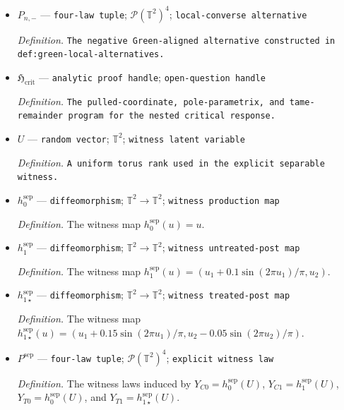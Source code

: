 \documentclass{article}
\begin{document}
\begin{itemize}
  \item \(P_{n,-}\) --- \texttt{four-\allowbreak{}law tuple}; \(\mathcal P(\mathbb T^2)^4\); \texttt{local-\allowbreak{}converse alternative}
  \par\smallskip\noindent\emph{Definition.} \texttt{The negative Green-\allowbreak{}aligned alternative constructed in def:\allowbreak{}green-\allowbreak{}local-\allowbreak{}alternatives.}
  \item \(\mathfrak H_{\mathrm{crit}}\) --- \texttt{analytic proof handle}; \texttt{open-\allowbreak{}question handle}
  \par\smallskip\noindent\emph{Definition.} \texttt{The pulled-\allowbreak{}coordinate,\allowbreak{} pole-\allowbreak{}parametrix,\allowbreak{} and tame-\allowbreak{}remainder program for the nested critical response.}
  \item \(U\) --- \texttt{random vector}; \(\mathbb T^2\); \texttt{witness latent variable}
  \par\smallskip\noindent\emph{Definition.} \texttt{A uniform torus rank used in the explicit separable witness.}
  \item \(h_0^{\mathrm{sep}}\) --- \texttt{diffeomorphism}; \(\mathbb T^2\to\mathbb T^2\); \texttt{witness production map}
  \par\smallskip\noindent\emph{Definition.} The witness map \(h_0^{\mathrm{sep}}(u)=u\).
  \item \(h_1^{\mathrm{sep}}\) --- \texttt{diffeomorphism}; \(\mathbb T^2\to\mathbb T^2\); \texttt{witness untreated-\allowbreak{}post map}
  \par\smallskip\noindent\emph{Definition.} The witness map \(h_1^{\mathrm{sep}}(u)=(u_1+0.1\sin(2\pi u_1)/\pi,u_2)\).
  \item \(h_{1\star}^{\mathrm{sep}}\) --- \texttt{diffeomorphism}; \(\mathbb T^2\to\mathbb T^2\); \texttt{witness treated-\allowbreak{}post map}
  \par\smallskip\noindent\emph{Definition.} The witness map \(h_{1\star}^{\mathrm{sep}}(u)=(u_1+0.15\sin(2\pi u_1)/\pi,u_2-0.05\sin(2\pi u_2)/\pi)\).
  \item \(P^{\mathrm{sep}}\) --- \texttt{four-\allowbreak{}law tuple}; \(\mathcal P(\mathbb T^2)^4\); \texttt{explicit witness law}
  \par\smallskip\noindent\emph{Definition.} The witness laws induced by \(Y_{C0}=h_0^{\mathrm{sep}}(U)\), \(Y_{C1}=h_1^{\mathrm{sep}}(U)\), \(Y_{T0}=h_0^{\mathrm{sep}}(U)\), and \(Y_{T1}=h_{1\star}^{\mathrm{sep}}(U)\).
\end{itemize}
\end{document}
